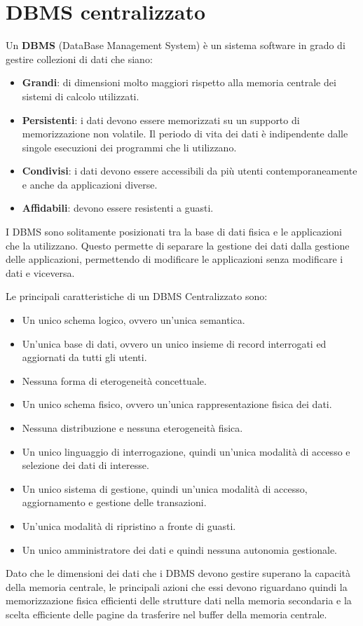 \section{DBMS centralizzato}
\begin{definizione}
    Un \textbf{DBMS} (DataBase Management System) è un sistema software in grado
    di gestire collezioni di dati che siano:
    \begin{itemize}
        \item \textbf{Grandi}: di dimensioni molto maggiori rispetto alla memoria
              centrale dei sistemi di calcolo utilizzati.
        \item \textbf{Persistenti}: i dati devono essere memorizzati su un
              supporto di memorizzazione non volatile. Il periodo di vita dei
              dati è indipendente dalle singole esecuzioni dei programmi che li
              utilizzano.
        \item \textbf{Condivisi}: i dati devono essere accessibili da più utenti
              contemporaneamente e anche da applicazioni diverse.
        \item \textbf{Affidabili}: devono essere resistenti a guasti.
    \end{itemize}
\end{definizione}
I DBMS sono solitamente posizionati tra la base di dati fisica e le applicazioni
che la utilizzano. Questo permette di separare la gestione dei dati dalla
gestione delle applicazioni, permettendo di modificare le applicazioni senza
modificare i dati e viceversa.

Le principali caratteristiche di un DBMS Centralizzato sono:
\begin{itemize}
    \item Un unico schema logico, ovvero un'unica semantica.
    \item Un'unica base di dati, ovvero un unico insieme di record interrogati
          ed aggiornati da tutti gli utenti.
    \item Nessuna forma di eterogeneità concettuale.
    \item Un unico schema fisico, ovvero un'unica rappresentazione fisica dei
          dati.
    \item Nessuna distribuzione e nessuna eterogeneità fisica.
    \item Un unico linguaggio di interrogazione, quindi un'unica modalità di
          accesso e selezione dei dati di interesse.
    \item Un unico sistema di gestione, quindi un'unica modalità di accesso,
          aggiornamento e gestione delle transazioni.
    \item Un'unica modalità di ripristino a fronte di guasti.
    \item Un unico amministratore dei dati e quindi nessuna autonomia gestionale.
\end{itemize}
Dato che le dimensioni dei dati che i DBMS devono gestire superano la capacità
della memoria centrale, le principali azioni che essi devono riguardano quindi la
memorizzazione fisica efficienti delle strutture dati nella memoria secondaria e
la scelta efficiente delle pagine da trasferire nel buffer della memoria
centrale.

